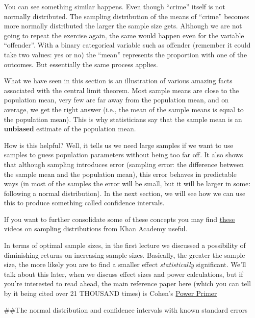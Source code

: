 \documentclass[]{book}
\theoremstyle{definition}
\theoremstyle{definition}
\theoremstyle{definition}
\theoremstyle{remark}
\begin{document}
You can see something similar happens. Even though ``crime'' itself is
not normally distributed. The sampling distribution of the means of
``crime'' becomes more normally distributed the larger the sample size
gets. Although we are not going to repeat the exercise again, the same
would happen even for the variable ``offender''. With a binary
categorical variable such as offender (remember it could take two
values: yes or no) the ``mean'' represents the proportion with one of
the outcomes. But essentially the same process applies.

What we have seen in this section is an illustration of various amazing
facts associated with the central limit theorem. Most sample means are
close to the population mean, very few are far away from the population
mean, and on average, we get the right answer (i.e., the mean of the
sample means is equal to the population mean). This is why statisticians
say that the sample mean is an \textbf{unbiased} estimate of the
population mean.

How is this helpful? Well, it tells us we need large samples if we want
to use samples to guess population parameters without being too far off.
It also shows that although sampling introduces error (sampling error:
the difference between the sample mean and the population mean), this
error behaves in predictable ways (in most of the samples the error will
be small, but it will be larger in some: following a normal
distribution). In the next section, we will see how we can use this to
produce something called confidence intervals.

If you want to further consolidate some of these concepts you may find
\href{https://www.khanacademy.org/math/probability/statistics-inferential/sampling_distribution/v/central-limit-theorem}{these
videos} on sampling distributions from Khan Academy useful.

In terms of optimal sample sizes, in the first lecture we discussed a
possibility of diminishing returns on increasing sample sizes.
Basically, the greater the sample size, the more likely you are to find
a smaller effect \emph{statistically} significant. We'll talk about this
later, when we discuss effect sizes and power calculations, but if
you're interested to read ahead, the main reference paper here (which
you can tell by it being cited over 21 THOUSAND times) is Cohen's
\href{http://neuron4.psych.ubc.ca/~schaller/528Readings/Cohen1992.pdf}{Power
Primer}

\#\#The normal distribution and confidence intervals with known standard
errors
\end{document}
